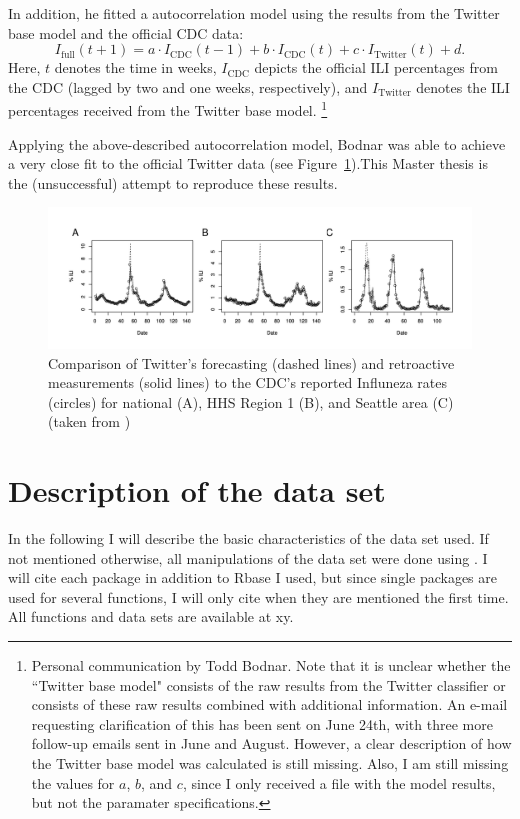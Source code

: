 \documentclass[11pt, a4paper,twoside]{report}\usepackage[]{graphicx}\usepackage[]{color}
\begin{document}
In addition, he fitted a autocorrelation model using the results from the Twitter base model and the official CDC data: 
$$I_{\text{full}}(t + 1) = a \cdot I_{\text{CDC}}(t - 1) + b \cdot I_{\text{CDC}}(t) + c \cdot I_{\text{Twitter}}(t) + d.$$
Here, $t$ denotes the time in weeks, $I_{\text{CDC}}$ depicts the official ILI percentages from the CDC (lagged by two and one weeks, respectively), and $I_{\text{Twitter}}$ denotes the ILI percentages received from the Twitter base model. \footnote{Personal communication by Todd Bodnar. Note that it is unclear whether the ``Twitter base model" consists of the raw results from the Twitter classifier or consists of these raw results combined with additional information. An e-mail requesting clarification of this has been sent on June 24th, with three more follow-up emails sent in June and August. However, a clear description of how the Twitter base model was calculated is still missing. Also, I am still missing the values for $a$, $b$, and $c$, since I only received a file with the model results, but not the paramater specifications.}\newline

Applying the above-described autocorrelation model, Bodnar was able to achieve a very close fit to the official Twitter data (see Figure~\ref{fig:cdc_fit_bodnar_thesis}).This Master thesis is the (unsuccessful) attempt to reproduce these results. 

\begin{figure}[h]
  \centering
    \includegraphics[width=.9\textwidth]{cdc_fit_bodnar_thesis.png}
  \caption{Comparison of Twitter's forecasting (dashed lines) and retroactive measurements (solid lines) to the CDC's reported Influneza rates (circles) for national (A), HHS Region 1 (B), and Seattle area (C) (taken from \citep{bodnar_data_2015})}
  \label{fig:cdc_fit_bodnar_thesis}
  \end{figure}
  
\thispagestyle{empty}
\cleardoublepage

\chapter{Description of the data set}
\label{ch:data_set_description}
In the following I will describe the basic characteristics of the data set used. If not mentioned otherwise, all manipulations of the data set were done using . I will cite each package in addition to Rbase I used, but since single packages are used for several functions, I will only cite when they are mentioned the first time. All functions and data sets are available at xy.
\end{document}
